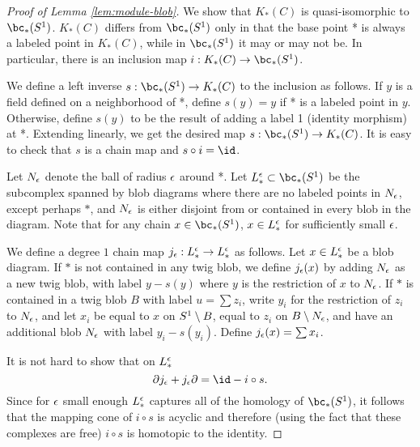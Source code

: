 \begin{proof}[Proof of Lemma \ref{lem:module-blob}]
We show that $K_*(C)$ is quasi-isomorphic to $\bc_*(S^1)$.
$K_*(C)$ differs from $\bc_*(S^1)$ only in that the base point *
is always a labeled point in $K_*(C)$, while in $\bc_*(S^1)$ it may or may not be.
In particular, there is an inclusion map $i: K_*(C) \to \bc_*(S^1)$.

We define a left inverse $s: \bc_*(S^1) \to K_*(C)$ to the inclusion as follows.
If $y$ is a field defined on a neighborhood of *, define $s(y) = y$ if
* is a labeled point in $y$.
Otherwise, define $s(y)$ to be the result of adding a label 1 (identity morphism) at *.
Extending linearly, we get the desired map $s: \bc_*(S^1) \to K_*(C)$.
It is easy to check that $s$ is a chain map and $s \circ i = \id$.

Let $N_\epsilon$ denote the ball of radius $\epsilon$ around *.
Let $L_*^\ep \sub \bc_*(S^1)$ be the subcomplex 
spanned by blob diagrams
where there are no labeled points
in $N_\epsilon$, except perhaps $*$, and $N_\epsilon$ is either disjoint from or contained in 
every blob in the diagram.
Note that for any chain $x \in \bc_*(S^1)$, $x \in L_*^\epsilon$ for sufficiently small $\epsilon$.

We define a degree $1$ chain map $j_\epsilon: L_*^\epsilon \to L_*^\epsilon$ as follows. Let $x \in L_*^\epsilon$ be a blob diagram.
If $*$ is not contained in any twig blob, we define $j_\epsilon(x)$ by adding $N_\epsilon$ as a new twig blob, with label $y - s(y)$ where $y$ is the restriction
of $x$ to $N_\epsilon$. If $*$ is contained in a twig blob $B$ with label $u=\sum z_i$,
write $y_i$ for the restriction of $z_i$ to $N_\epsilon$, and let
$x_i$ be equal to $x$ on $S^1 \setminus B$, equal to $z_i$ on $B \setminus N_\epsilon$,
and have an additional blob $N_\epsilon$ with label $y_i - s(y_i)$.
Define $j_\epsilon(x) = \sum x_i$.

It is not hard to show that on $L_*^\epsilon$
\[
	\bd j_\ep  + j_\ep \bd = \id - i \circ s .
\]
Since for $\epsilon$ small enough $L_*^\epsilon$ captures all of the
homology of $\bc_*(S^1)$, 
it follows that the mapping cone of $i \circ s$ is acyclic and therefore (using the fact that
these complexes are free) $i \circ s$ is homotopic to the identity.
\end{proof}


